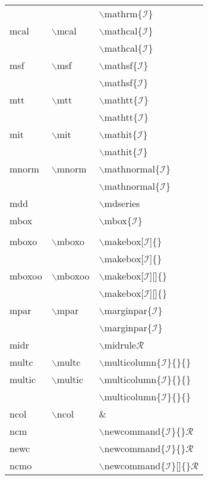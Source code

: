 \begin{longtable}{p{20mm}p{20mm}p{65mm}}
 &  & $\backslash$mathrm\{$\mathcal{I}$\}\\
mcal & $\backslash$mcal & $\backslash$mathcal\{$\mathcal{I}$\}\\
 &  & $\backslash$mathcal\{$\mathcal{I}$\}\\
msf & $\backslash$msf & $\backslash$mathsf\{$\mathcal{I}$\}\\
 &  & $\backslash$mathsf\{$\mathcal{I}$\}\\
mtt & $\backslash$mtt & $\backslash$mathtt\{$\mathcal{I}$\}\\
 &  & $\backslash$mathtt\{$\mathcal{I}$\}\\
mit & $\backslash$mit & $\backslash$mathit\{$\mathcal{I}$\}\\
 &  & $\backslash$mathit\{$\mathcal{I}$\}\\
mnorm & $\backslash$mnorm & $\backslash$mathnormal\{$\mathcal{I}$\}\\
 &  & $\backslash$mathnormal\{$\mathcal{I}$\}\\
mdd &  & $\backslash$mdseries\\
mbox &  & $\backslash$mbox\{$\mathcal{I}$\}\\
 &  & \\
mboxo & $\backslash$mboxo & $\backslash$makebox[$\mathcal{I}$]\{\}\\
 &  & $\backslash$makebox[$\mathcal{I}$]\{\}\\
mboxoo & $\backslash$mboxoo & $\backslash$makebox[$\mathcal{I}$][]\{\}\\
 &  & $\backslash$makebox[$\mathcal{I}$][]\{\}\\
mpar & $\backslash$mpar & $\backslash$marginpar\{$\mathcal{I}$\}\\
 &  & $\backslash$marginpar\{$\mathcal{I}$\}\\
midr &  & $\backslash$midrule$\mathcal{R}$\\
multc & $\backslash$multc & $\backslash$multicolumn\{$\mathcal{I}$\}\{\}\{\}\\
multic & $\backslash$multic & $\backslash$multicolumn\{$\mathcal{I}$\}\{\}\{\}\\
 &  & $\backslash$multicolumn\{$\mathcal{I}$\}\{\}\{\}\\
ncol & $\backslash$ncol &  \& \\
ncm &  & $\backslash$newcommand\{$\mathcal{I}$\}\{\}$\mathcal{R}$\\
newc &  & $\backslash$newcommand\{$\mathcal{I}$\}\{\}$\mathcal{R}$\\
ncmo &  & $\backslash$newcommand\{$\mathcal{I}$\}[]\{\}$\mathcal{R}$\\

\end{longtable}
